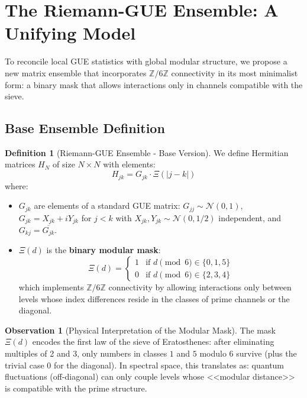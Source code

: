 \documentclass[12pt, a4paper]{article}
\theoremstyle{plain}
\theoremstyle{definition}
\newtheorem{definicion}[teorema]{Definition}
\newtheorem{observacion}[teorema]{Observation}
\theoremstyle{remark}
\newcommand{\Z}{\mathbb{Z}}
\begin{document}
\section{The Riemann-GUE Ensemble: A Unifying Model}
\label{sec:ensemble_riemann}

To reconcile local GUE statistics with global modular structure, we propose a new matrix ensemble that incorporates $\Z/6\Z$ connectivity in its most minimalist form: a binary mask that allows interactions only in channels compatible with the sieve.

\subsection{Base Ensemble Definition}
\label{subsec:definicion_ensemble}

\begin{definicion}[Riemann-GUE Ensemble - Base Version]
\label{def:ensemble_base}
We define Hermitian matrices $H_N$ of size $N \times N$ with elements:
\[
H_{jk} = G_{jk} \cdot \Xi(|j-k|)
\]
where:
\begin{itemize}
\item $G_{jk}$ are elements of a standard GUE matrix: $G_{jj} \sim \mathcal{N}(0,1)$, $G_{jk} = X_{jk} + i Y_{jk}$ for $j < k$ with $X_{jk}, Y_{jk} \sim \mathcal{N}(0,1/2)$ independent, and $G_{kj} = \overline{G_{jk}}$.

\item $\Xi(d)$ is the \textbf{binary modular mask}:
\[
\Xi(d) = 
\begin{cases}
1 & \text{if } d \pmod{6} \in \{0, 1, 5\} \\
0 & \text{if } d \pmod{6} \in \{2, 3, 4\}
\end{cases}
\]
which implements $\Z/6\Z$ connectivity by allowing interactions only between levels whose index differences reside in the classes of prime channels or the diagonal.
\end{itemize}
\end{definicion}

\begin{observacion}[Physical Interpretation of the Modular Mask]
The mask $\Xi(d)$ encodes the first law of the sieve of Eratosthenes: after eliminating multiples of 2 and 3, only numbers in classes $1$ and $5$ modulo 6 survive (plus the trivial case 0 for the diagonal). In spectral space, this translates as: quantum fluctuations (off-diagonal) can only couple levels whose <<modular distance>> is compatible with the prime structure.
\end{observacion}
\end{document}
